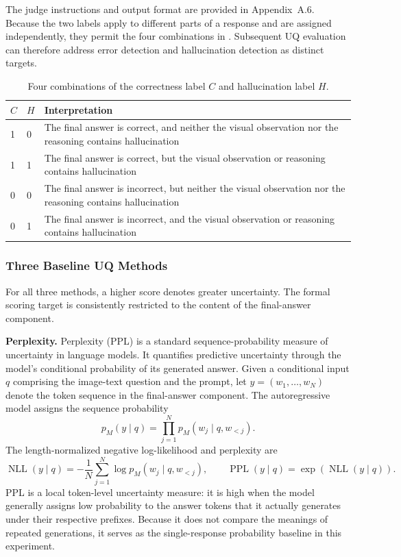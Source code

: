 The judge instructions and output format are provided in Appendix~A.6. Because the two labels apply to different parts of a response and are assigned independently, they permit the four combinations in . Subsequent UQ evaluation can therefore address error detection and hallucination detection as distinct targets.

\begin{table}[H]
\centering
\caption{Four combinations of the correctness label $C$ and hallucination label $H$.}
\label{tab:correctness_hallucination_labels}
\small
\setlength{\tabcolsep}{8pt}
\renewcommand{\arraystretch}{1.15}
\begin{tabularx}{0.82\linewidth}{@{}C{1.2cm}C{1.2cm}Y@{}}
\toprule
$C$ & $H$ & Interpretation \\
 & 0 & The final answer is correct, and neither the visual observation nor the reasoning contains hallucination \\
1 & 1 & The final answer is correct, but the visual observation or reasoning contains hallucination \\
0 & 0 & The final answer is incorrect, but neither the visual observation nor the reasoning contains hallucination \\
0 & 1 & The final answer is incorrect, and the visual observation or reasoning contains hallucination \\
\bottomrule
\end{tabularx}
\end{table}

\subsubsection{Three Baseline UQ Methods}
\label{subsubsec:baseline_uq}

For all three methods, a higher score denotes greater uncertainty. The formal scoring target is consistently restricted to the content of the final-answer component.

\textbf{Perplexity.} Perplexity (PPL) is a standard sequence-probability measure of uncertainty in language models. It quantifies predictive uncertainty through the model's conditional probability of its generated answer. Given a conditional input $q$ comprising the image-text question and the prompt, let $y=(w_1,\ldots,w_N)$ denote the token sequence in the final-answer component. The autoregressive model assigns the sequence probability
\[
p_M(y\mid q)=\prod_{j=1}^{N}p_M(w_j\mid q,w_{<j}).
\]
The length-normalized negative log-likelihood and perplexity are
\[
\operatorname{NLL}(y\mid q)=-\frac{1}{N}\sum_{j=1}^{N}\log p_M(w_j\mid q,w_{<j}),
\qquad
\operatorname{PPL}(y\mid q)=\exp\!\left(\operatorname{NLL}(y\mid q)\right).
\]
PPL is a local token-level uncertainty measure: it is high when the model generally assigns low probability to the answer tokens that it actually generates under their respective prefixes. Because it does not compare the meanings of repeated generations, it serves as the single-response probability baseline in this experiment.


